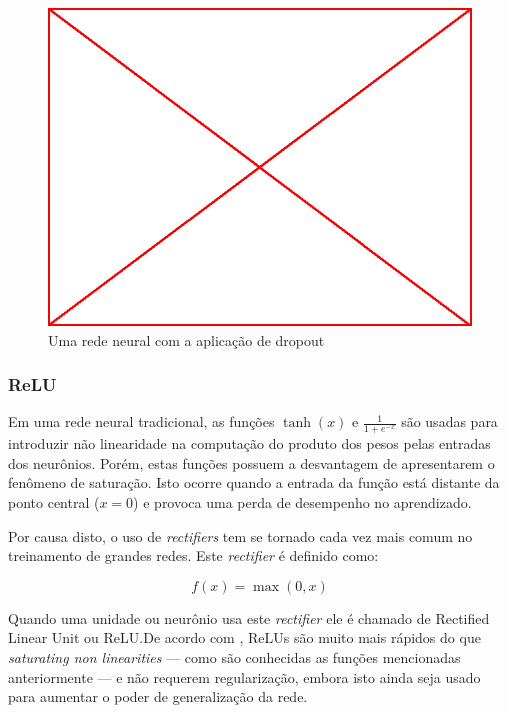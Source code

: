 \begin{figure}
  \caption{Uma rede neural com a aplicação de dropout}
  \begin{center}
    \includegraphics[scale=0.5]{placeholder}
  \end{center}
\end{figure}

\subsubsection{ReLU}

Em uma rede neural tradicional, as funções $\tanh(x)$ e $\frac{1}{1+e^{-x}}$ são
usadas para introduzir não linearidade na computação do produto dos pesos pelas
entradas dos neurônios. Porém, estas funções possuem a desvantagem de
apresentarem o fenômeno de saturação. Isto ocorre quando a entrada da função
está distante da ponto central ($x=0$) e provoca uma perda de desempenho no
aprendizado.\cite{krizhevsky2012imagenet}

Por causa disto, o uso de \emph{rectifiers} tem se tornado cada vez mais comum
no treinamento de grandes redes. Este \emph{rectifier} é definido como:

$$ f(x) = \max(0,x) $$

Quando uma unidade ou neurônio usa este \emph{rectifier} ele é chamado de
Rectified Linear Unit ou ReLU.\@ De acordo com \citep{krizhevsky2012imagenet},
ReLUs são muito mais rápidos do que \emph{saturating non linearities} --- como
são conhecidas as funções mencionadas anteriormente --- e não requerem
regularização, embora isto ainda seja usado para aumentar o poder de
generalização da rede.

